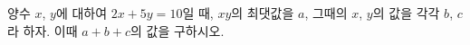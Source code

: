 양수 $x$, $y$에 대하여 $2x+5y=10$일 때, $xy$의 최댓값을 $a$, 그때의 $x$, $y$의 값을 각각 $b$, $c$라 하자. 이때 $a+b+c$의 값을 구하시오.
